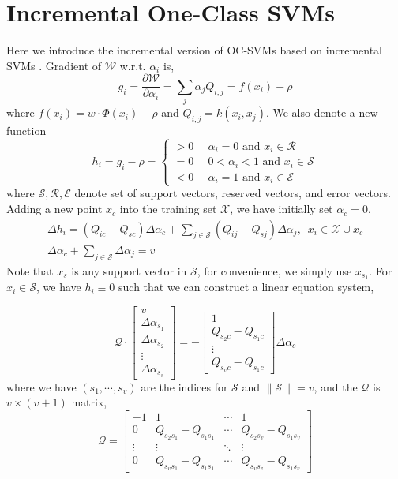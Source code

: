 \documentclass{llncs}
\newcommand{\diff}[2]{\frac{\partial #1}{\partial #2}}
\newcommand{\set}[1]{\ensuremath{\mathcal{#1}}}
\begin{document}
\section{Incremental One-Class SVMs}
Here we introduce the incremental version of OC-SVMs based on incremental SVMs \cite{caugh01}.
Gradient of $\set W$ w.r.t. $\alpha_i$ is,
\[
g_i = \diff{\set W}{\alpha_i} = \sum_j\alpha_j Q_{i,j} = f(x_i)+\rho
\]
where $f(x_i)=w\cdot \Phi(x_i)-\rho$ and $Q_{i,j}=k(x_i,x_j)$. We also denote a new function 
\[
h_i=g_i-\rho = \left\lbrace 
\begin{array}{ll}
>0 & \,\,\, \alpha_i=0 \text{ and } x_i \in \set R \\
=0 & \,\,\, 0<\alpha_i<1 \text{ and } x_i \in \set S \\
<0 & \,\,\, \alpha_i=1 \text{ and } x_i \in \set E
\end{array} \right.
\]
where $\set S, \set R, \set E$ denote set of support vectors, reserved vectors, and error vectors. 
Adding a new point $x_c$ into the training set $\set X$, we have initially set $\alpha_c=0$,
\begin{eqnarray}
\Delta h_i =  (Q_{ic}-Q_{sc})\Delta\alpha_c + \sum_{j\in \set S}(Q_{ij}-Q_{sj})\Delta\alpha_j,
\,\,\, x_i \in \set X \cup x_c \\
\Delta\alpha_c+\sum_{j\in\set S}\Delta\alpha_j  = v
\end{eqnarray}
Note that $x_s$ is any support vector in $\set S$, for convenience, we simply use $x_{s_1}$. For $x_i \in \set S$, we have $h_i\equiv 0$ such that we can construct a linear equation system,

\begin{equation}
\mathcal{Q}\cdot
\begin{bmatrix}
v\\
\Delta\alpha_{s_1}\\
\Delta\alpha_{s_2}\\
\vdots \\
\Delta\alpha_{s_v}
\end{bmatrix} = -\begin{bmatrix}
1 \\
Q_{s_2 c}-Q_{s_1 c}\\
\vdots \\
Q_{s_v c}-Q_{s_1 c}
\end{bmatrix}\Delta\alpha_c
\end{equation}
where we have $(s_1, \cdots,s_v)$ are the indices for $\set S$ and $\|\set S\|=v$, and the $\mathcal{Q}$ is $v\times (v+1)$ matrix, 
\[
\mathcal{Q} = \begin{bmatrix}
-1 & 1 & \cdots & 1 \\
0 & Q_{s_2 s_1}-Q_{s_1 s_1} & \cdots & Q_{s_2 s_v}-Q_{s_1 s_v} \\
\vdots & \vdots & \ddots & \vdots \\
0 & Q_{s_v s_1}-Q_{s_1 s_1} & \cdots & Q_{s_v s_v}-Q_{s_1 s_v}
\end{bmatrix}
\]
\end{document}
